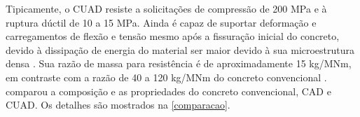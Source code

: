 Tipicamente, o CUAD resiste a solicitações de compressão de 200 MPa e à ruptura dúctil de 10 a 15 MPa. Ainda é capaz de suportar deformação e carregamentos de flexão e tensão mesmo após a fissuração inicial do concreto, devido à dissipação de energia do material ser maior devido à sua microestrutura densa \cite[p.~1]{Gunes}. Sua razão de massa para resistência é de aproximadamente 15 kg/MNm, em contraste com a razão de 40 a 120 kg/MNm do concreto convencional \cite[p.~461]{Stengel}.  comparou a composição e as propriedades do concreto convencional, CAD e CUAD.  Os detalhes são mostrados na \autoref{comparacao}.

\begin{table}[htb]
\end{table}

